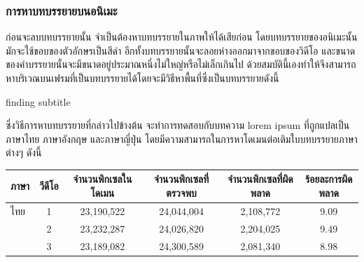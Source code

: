 \documentclass[hidelinks, a4paper,12pt]{article}
\numberwithin{equation}{section}							%
\numberwithin{equation}{section}
\begin{document}
{	
	\subsubsection{การหาบทบรรยายบนอนิเมะ}	
	\hspace{1cm}ก่อนจะลบบทบรรยายนั้น จำเป็นต้องหาบทบรรยายในภาพให้ได้เสียก่อน โดยบทบรรยายของอนิเมะนั้น มักจะใช้ขอบของตัวอักษรเป็นสีดำ อีกทั้งบทบรรยายนั้นจะลอยห่างออกมาจากขอบของวิดีโอ และขนาดของคำบรรยายนั้นจะมีขนาดอยู่ประมาณหนึ่งไม่ใหญ่หรือไม่เล็กเกินไป ด้วยสมบัตินี้เองทำให้จึงสามารถหาบริเวณบนเฟรมที่เป็นบทบรรยายได้โดยจะมีวิธีหาพื้นที่ซึ่งเป็นบทบรรยายดังนี้
	
	\vspace{1cm}
	
	\begin{algorithm}[H]
		\caption{finding subtitle}
	\end{algorithm}
	\clearpage
	\hspace{1cm} ซึ่งวิธีการหาบทบรรยายที่กล่าวไปข้างต้น จะทำการทดสอบกับบทความ lorem ipsum ที่ถูกแปลเป็นภาษาไทย ภาษาอังกฤษ และภาษาญี่ปุ่น โดยมีความสามารถในการหาโดเมนต่อเติมใบบทบรรยายภาษาต่างๆ ดังนี้
	\begin{table}[H]
		\centering
		\footnotesize
		\begin{tabular}[ht]{|l|c|c|c|c|c|}
			\hline
			ภาษา  & วีดีโอ & จำนวนพิกเซลในโดเมน & จำนวนพิกเซลที่ตรวจพบ & จำนวนพิกเซลที่ผิดพลาด & ร้อยละการผิดพลาด \\
			\hline
			ไทย & 1 & 23,190,522  & 24,044,004 & 2,108,772 &9.09\\
				 & 2 & 23,232,287 & 24,026,820 & 2,204,025 & 9.49\\
				& 3 & 23,189,082 & 24,300,589 & 2,081,340 & 8.98\\

\end{tabular}
\end{table}}
\end{document}
